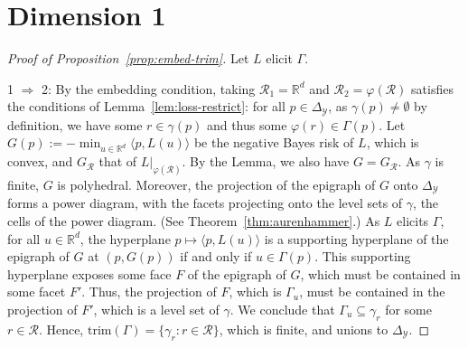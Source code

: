 \documentclass[12pt]{article}
\newcommand{\reals}{\mathbb{R}}
\newcommand{\simplex}{\Delta_\Y}
\newcommand{\R}{\mathcal{R}}
\newcommand{\Y}{\mathcal{Y}}
\newcommand{\inprod}[2]{\langle #1, #2 \rangle}%
\newcommand{\trim}{\mathrm{trim}}
\DeclareMathOperator*{\argmin}{arg\,min}
\begin{document}
\section{Dimension 1}\label{app:dimension-1}
\begin{proof}[Proof of Proposition~\ref{prop:embed-trim}]
  Let $L$ elicit $\Gamma$.

  1 $\Rightarrow$ 2:
  By the embedding condition, taking $\R_1 = \reals^d$ and $\R_2 = \varphi(\R)$ satisfies the conditions of Lemma~\ref{lem:loss-restrict}: for all $p\in\simplex$, as $\gamma(p) \neq \emptyset$ by definition, we have some $r\in\gamma(p)$ and thus some $\varphi(r) \in \Gamma(p)$.
  Let $G(p) := -\min_{u\in\reals^d} \inprod{p}{L(u)}$ be the negative Bayes risk of $L$, which is convex, and $G_{\R}$ that of $L|_{\varphi(\R)}$.
  By the Lemma, we also have $G = G_\R$.
  As $\gamma$ is finite, $G$ is polyhedral.
  Moreover, the projection of the epigraph of $G$ onto $\simplex$ forms a power diagram, with the facets projecting onto the level sets of $\gamma$, the cells of the power diagram.
  (See Theorem~\ref{thm:aurenhammer}.)
  As $L$ elicits $\Gamma$, for all $u\in\reals^d$, the hyperplane $p\mapsto \inprod{p}{L(u)}$ is a supporting hyperplane of the epigraph of $G$ at $(p,G(p))$ if and only if $u\in\Gamma(p)$.
  This supporting hyperplane exposes some face $F$ of the epigraph of $G$, which must be contained in some facet $F'$.
  Thus, the projection of $F$, which is $\Gamma_u$, must be contained in the projection of $F'$, which is a level set of $\gamma$.
  We conclude that $\Gamma_u \subseteq \gamma_r$ for some $r\in\R$.
  Hence, $\trim(\Gamma) = \{\gamma_r : r\in\R\}$, which is finite, and unions to $\simplex$.




\end{proof}
\end{document}
